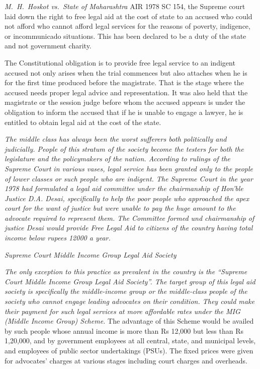 \begin{multicols}{2}
\noi
\textit{M.~H.~Hoskot vs.~State of Maharashtra} AIR 1978 SC 154, the Supreme court laid down the right to free legal aid at the cost of state to an accused who could not afford who cannot afford legal services for the reasons of poverty, indigence, or incommunicado situations. This has been declared to be a duty of the state and not government charity.

\noi
The Constitutional obligation is to provide free legal service to an indigent accused not only arises when the trial commences but also attaches when he is for the first time produced before the magistrate. That is the stage where the accused needs proper legal advice and representation. It was also held that the magistrate or the session judge before whom the accused appears is under the obligation to inform the accused that if he is unable to engage a lawyer, he is entitled to obtain legal aid at the cost of the state.


\noi
\textit{The middle class has always been the worst sufferers both politically and judicially. People of this stratum of the society become the testers for both the legislature and the policymakers of the nation. According to rulings of the Supreme Court in various vases, legal service has been granted only to the people of lower classes or such people who are indigent. The Supreme Court in the year 1978 had formulated a legal aid committee under the chairmanship of Hon’ble Justice D.A. Desai, specifically to help the poor people who approached the apex court for the want of justice but were unable to pay the huge amount to the advocate required to represent them. The Committee formed und chairmanship of justice Desai would provide Free Legal Aid to citizens of the country having total income below rupees 12000 a year.}

\noi
\textit{Supreme Court Middle Income Group Legal Aid Society}

\noi
\textit{The only exception to this practice as prevalent in the country is the “Supreme Court Middle Income Group Legal Aid Society”. The target group of this legal aid society is specifically the middle-income group or the middle-class people of the society who cannot engage leading advocates on their condition. They could make their payment for such legal services at more affordable rates under the MIG (Middle Income Group) Scheme.} The advantage of this Scheme would be availed by such people whose annual income is more than Rs 12,000 but less than Rs 1,20,000, and by government employees at all central, state, and municipal levels, and employees of public sector undertakings (PSUs). The fixed prices were given for advocates’ charges at various stages including court charges and overheads.


\end{multicols}
